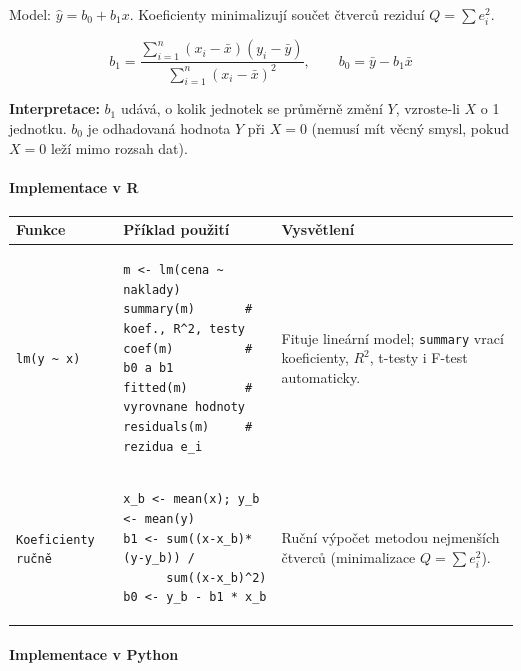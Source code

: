 \documentclass[a4paper, 11pt]{article}
\newenvironment{funkcedict}
{%
  \begingroup
  \renewcommand{\arraystretch}{1.4}%
  \lstset{basicstyle=\ttfamily\small, columns=fullflexible}%
  \setlength{\tabcolsep}{4pt}%
  \begin{tabular}{p{0.19\textwidth} p{0.38\textwidth} p{0.30\textwidth}}
  \textbf{Funkce} & \textbf{Příklad použití} & \textbf{Vysvětlení} \\
  \midrule
}
{%
  \end{tabular}%
  \endgroup
}
\begin{document}
Model: $\hat{y} = b_0 + b_1 x$. Koeficienty minimalizují součet čtverců reziduí $Q = \sum e_i^2$.

\begin{equation*}
	b_1 = \frac{\sum_{i=1}^n (x_i - \bar{x})(y_i - \bar{y})}{\sum_{i=1}^n (x_i - \bar{x})^2}, \qquad b_0 = \bar{y} - b_1 \bar{x}
\end{equation*}

\textbf{Interpretace:} $b_1$ udává, o kolik jednotek se průměrně změní $Y$, vzroste-li $X$ o 1 jednotku.
$b_0$ je odhadovaná hodnota $Y$ při $X = 0$ (nemusí mít věcný smysl, pokud $X = 0$ leží mimo rozsah dat).

\paragraph{Implementace v R}\mbox{}\par

\begin{funkcedict}

	\texttt{lm(y \textasciitilde\ x)} &
	\begin{lstlisting}
m <- lm(cena ~ naklady)
summary(m)       # koef., R^2, testy
coef(m)          # b0 a b1
fitted(m)        # vyrovnane hodnoty
residuals(m)     # rezidua e_i
	\end{lstlisting}
	&
	Fituje lineární model; \texttt{summary} vrací koeficienty, $R^2$, t-testy i F-test automaticky. \\

	\texttt{Koeficienty ručně} &
	\begin{lstlisting}
x_b <- mean(x); y_b <- mean(y)
b1 <- sum((x-x_b)*(y-y_b)) /
      sum((x-x_b)^2)
b0 <- y_b - b1 * x_b
	\end{lstlisting}
	&
	Ruční výpočet metodou nejmenších čtverců (minimalizace $Q = \sum e_i^2$). \\

\end{funkcedict}

\paragraph{Implementace v Python}\mbox{}\par
\end{document}
